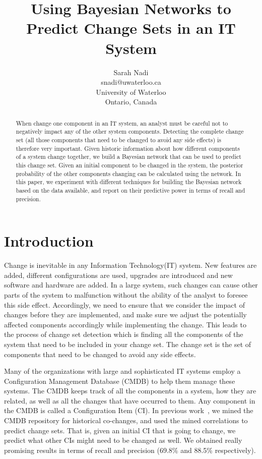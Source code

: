 \documentclass[10pt,twocolumn,letterpaper]{article}
\begin{document}
 
\title{Using Bayesian Networks to Predict Change Sets in an IT System}

\author{Sarah Nadi\\snadi@uwaterloo.ca\\University of Waterloo\\ Ontario, Canada}        
\thispagestyle{empty}
\maketitle


\begin{abstract} 
When change one component in an IT system, an analyst must be careful not to negatively impact any of the other system components. Detecting the complete
change set (all those components that need to be changed to avoid any side effects) is therefore very important. Given historic information about how different
components of a system change together, we build a Bayesian network that can be used to predict this change set. Given an initial component to be changed in
the system, the posterior probability of the other components changing can be calculated using the network. In this paper, we experiment with different
techniques for building the Bayesian network based on the data available, and report on their predictive power in terms of recall and precision.
\end{abstract} 



\section{Introduction}
\label{intro}

Change is inevitable in any Information Technology(IT) system. New features are added, different configurations are used, upgrades are introduced and new
software and hardware are added. In a large system, such changes can cause other parts of the system to malfunction without the ability of the analyst to
foresee this side effect. Accordingly, we need to ensure that we consider the impact of changes before they are implemented, and make sure we adjust the
potentially affected components accordingly while implementing the change. This leads to the process of change set detection which is finding all the
components of the system that need to be included in your change set. The change set is the set of components that need to be changed to avoid any side
effects. 

Many of the organizations with large and sophisticated IT systems employ a Configuration Management Database (CMDB) to help them manage these systems.
The CMDB keeps track of all the components in a system, how they are related, as well as all the changes that have occurred to them. Any component in the CMDB
is called a Configuration Item (CI). In previous work~\cite{nadi2010}, we mined the CMDB repository for historical co-changes, and used the mined correlations
to predict change sets. That is, given an initial CI that is going to change, we predict what other CIs might need to be changed as well. We obtained really
promising results in terms of recall and precision (69.8\% and 88.5\% respectively). 
\end{document}
